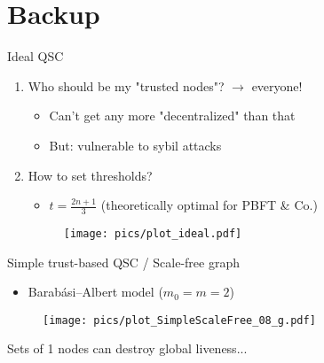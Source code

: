 \documentclass{beamer}
\newcommand{\redalert}[1]{\textcolor{hured}{#1}}
\newcommand{\arrow}[1][]{$\xrightarrow{\text{#1}}$ }
\begin{document}
\section{Backup}

\begingroup
  \renewcommand{\insertframenumber}{}
  \begin{frame}
  \end{frame}
\endgroup

\begin{frame}{Ideal QSC}
  \begin{enumerate}
    \item \alert{Who should be my "trusted nodes"?} \arrow \alert{everyone}!
    \begin{itemize}
      \item Can't get any more "decentralized" than that
      \item But: vulnerable to \redalert{sybil attacks}
    \end{itemize}
    \item \alert{How to set thresholds?} \begin{itemize}
      \item $t = \frac{2n + 1}{3}$ (theoretically optimal for PBFT \& Co.)
    \end{itemize}
    \begin{figure}[htpb]
      \centering
      \texttt{[image: pics/plot\_ideal.pdf]}
    \end{figure}
  \end{enumerate}
\end{frame}

\begin{frame}{Simple trust-based QSC / Scale-free graph}
  \begin{itemize}
    \item Barabási–Albert model ($m_0 = m = 2$)
  \end{itemize}
  \begin{figure}[htpb]
    \centering
    \texttt{[image: pics/plot\_SimpleScaleFree\_08\_g.pdf]}
  \end{figure}
  Sets of \redalert{1} nodes can destroy global liveness...
\end{frame}
\end{document}
